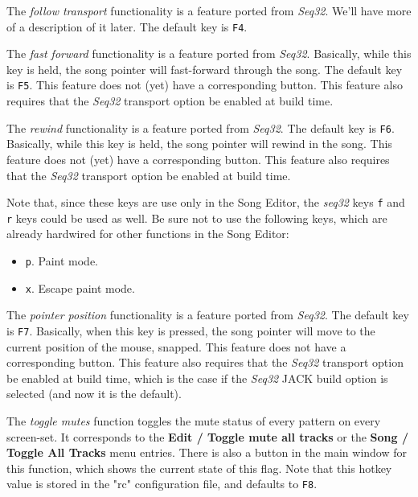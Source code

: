    The \textsl{follow transport} functionality is a feature ported
   from \textsl{Seq32}.  We'll have more of a description of it later.
   The default key is \texttt{F4}.

   The \textsl{fast forward} functionality is a feature ported
   from \textsl{Seq32}.
   Basically, while this key is held, the song pointer will fast-forward
   through the song.
   The default key is \texttt{F5}.
   This feature does not (yet) have a corresponding button.
   This feature also requires that the \textsl{Seq32} transport option be
   enabled at build time.

   The \textsl{rewind} functionality is a feature ported
   from \textsl{Seq32}.
   The default key is \texttt{F6}.
   Basically, while this key is held, the song pointer will rewind in
   the song.
   This feature does not (yet) have a corresponding button.
   This feature also requires that the \textsl{Seq32} transport option be
   enabled at build time.

   Note that, since these keys are use only in the Song Editor,
   the \textsl{seq32} keys \texttt{f} and \texttt{r} keys could be
   used as well.  Be sure not to use the following keys, which are already
   hardwired for other functions in the Song Editor:

   \begin{itemize}
      \item \texttt{p}.  Paint mode.
      \item \texttt{x}.  Escape paint mode.
   \end{itemize}


   The \textsl{pointer position} functionality is a feature ported
   from \textsl{Seq32}.
   The default key is \texttt{F7}.
   Basically, when this key is pressed, the song pointer will move to the
   current position of the mouse, snapped.
   This feature does not have a corresponding button.
   This feature also requires that the \textsl{Seq32} transport option be
   enabled at build time, which is the case if the \textsl{Seq32} JACK build
   option is selected (and now it is the default).

   The \textsl{toggle mutes} function toggles the mute status of every
   pattern on every screen-set.  It corresponds to the
   \textbf{Edit / Toggle mute all tracks} or the 
   \textbf{Song / Toggle All Tracks}
   menu entries.  There is also a button in the main window for this function,
   which shows the current state of this flag.  Note that this
   hotkey value is stored in the "rc" configuration file, and
   defaults to \texttt{F8}.

